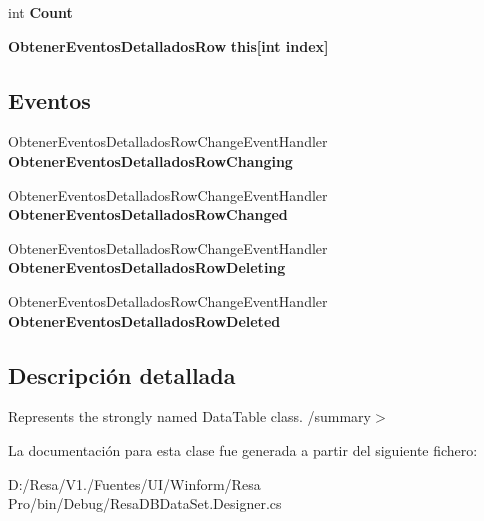 \begin{DoxyCompactItemize}
\item 
int {\bfseries Count}\hspace{0.3cm}{\ttfamily  [get]}\label{class_resa___pro_1_1_resa_d_b_data_set_1_1_obtener_eventos_detallados_data_table_a94c1bdae6aea89cb3d1de7c77a142d9e}

\item 
{\bf Obtener\+Eventos\+Detallados\+Row} {\bfseries this[int index]}\hspace{0.3cm}{\ttfamily  [get]}\label{class_resa___pro_1_1_resa_d_b_data_set_1_1_obtener_eventos_detallados_data_table_af7697ecee3fbf8a7319874c989e85477}

\end{DoxyCompactItemize}
\subsection*{Eventos}
\begin{DoxyCompactItemize}
\item 
Obtener\+Eventos\+Detallados\+Row\+Change\+Event\+Handler {\bfseries Obtener\+Eventos\+Detallados\+Row\+Changing}\label{class_resa___pro_1_1_resa_d_b_data_set_1_1_obtener_eventos_detallados_data_table_a62b91f653c76a0fbf0de71fe08c2231a}

\item 
Obtener\+Eventos\+Detallados\+Row\+Change\+Event\+Handler {\bfseries Obtener\+Eventos\+Detallados\+Row\+Changed}\label{class_resa___pro_1_1_resa_d_b_data_set_1_1_obtener_eventos_detallados_data_table_adc0ccff867011d9f4e19e7cbf233dca5}

\item 
Obtener\+Eventos\+Detallados\+Row\+Change\+Event\+Handler {\bfseries Obtener\+Eventos\+Detallados\+Row\+Deleting}\label{class_resa___pro_1_1_resa_d_b_data_set_1_1_obtener_eventos_detallados_data_table_a30f5e64b229d436fc30cf990bea9b754}

\item 
Obtener\+Eventos\+Detallados\+Row\+Change\+Event\+Handler {\bfseries Obtener\+Eventos\+Detallados\+Row\+Deleted}\label{class_resa___pro_1_1_resa_d_b_data_set_1_1_obtener_eventos_detallados_data_table_a929b0e8fe7551a581e16362f65f4cc5e}

\end{DoxyCompactItemize}


\subsection{Descripción detallada}
Represents the strongly named Data\+Table class. /summary$>$ 

La documentación para esta clase fue generada a partir del siguiente fichero\+:\begin{DoxyCompactItemize}
\item 
D\+:/\+Resa/\+V1./\+Fuentes/\+U\+I/\+Winform/\+Resa Pro/bin/\+Debug/Resa\+D\+B\+Data\+Set.\+Designer.\+cs\end{DoxyCompactItemize}
